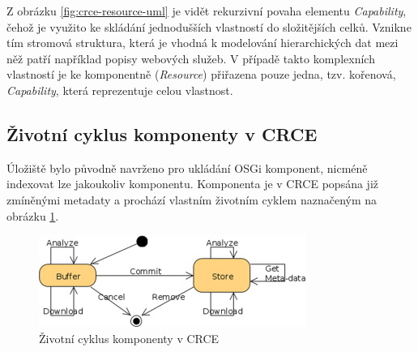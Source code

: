 \documentclass[czech,DP]{thesiskiv}
\begin{document}
Z obrázku \ref{fig:crce-resource-uml} je vidět rekurzivní povaha elementu \textit{Capability}, čehož je využito ke skládání jednodušších vlastností do složitějších celků. Vznikne tím stromová struktura, která je vhodná k modelování hierarchických dat mezi něž patří například popisy webových služeb. V případě takto komplexních vlastností je ke komponentně (\textit{Resource}) přiřazena pouze jedna, tzv. kořenová, \textit{Capability}, která reprezentuje celou vlastnost.


\subsection{Životní cyklus komponenty v CRCE}

Úložiště bylo původně navrženo pro ukládání OSGi komponent, nicméně indexovat lze jakoukoliv komponentu. Komponenta je v CRCE popsána již zmíněnými metadaty a prochází vlastním životním cyklem naznačeným na obrázku \ref{fig:crce-comp-lc}.

\begin{figure}[h]
	\centering
	\includegraphics{crce-component-lc.jpg}
	\caption{Životní cyklus komponenty v CRCE}
	\label{fig:crce-comp-lc}
\end{figure} 
\end{document}

